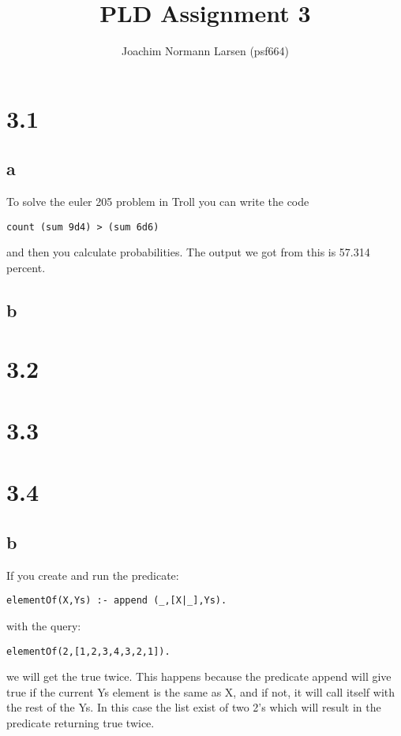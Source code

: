 \documentclass[10pt,a4paper]{article}      %
\title{PLD Assignment 3}
\author{Joachim Normann Larsen (psf664)}
\begin{document}
\hfuzz=50pt
\maketitle


\clearpage
\section*{3.1}
\subsection*{a}
To solve the euler 205 problem in Troll you can write the code
\begin{lstlisting}
count (sum 9d4) > (sum 6d6)
\end{lstlisting}
and then you calculate probabilities. The output we got from this is 57.314 percent.

\subsection*{b}

\section*{3.2}
\section*{3.3}
\section*{3.4}
\subsection*{b}
If you create and run the predicate:

\begin{lstlisting}
elementOf(X,Ys) :- append (_,[X|_],Ys).
\end{lstlisting}

with the query:

\begin{lstlisting}
elementOf(2,[1,2,3,4,3,2,1]).
\end{lstlisting}

we will get the true twice. This happens because the predicate append will give true if the current Ys element is the same as X, and if not, it will call itself with the rest of the Ys. In this case the list exist of two 2's which will result in the predicate returning true twice.
\end{document}
